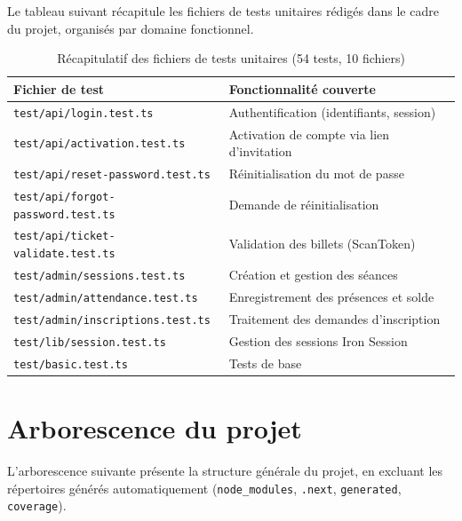 \documentclass{article}
\begin{document}
Le tableau suivant récapitule les fichiers de tests unitaires rédigés dans le cadre
du projet, organisés par domaine fonctionnel.

\begin{table}[H]
\centering
\renewcommand{\arraystretch}{1.4}
\begin{tabular}{p{8cm} p{6cm}}
\toprule
\textbf{Fichier de test} & \textbf{Fonctionnalité couverte} \\
\midrule
\texttt{test/api/login.test.ts}            & Authentification (identifiants, session) \\
\texttt{test/api/activation.test.ts}       & Activation de compte via lien d'invitation \\
\texttt{test/api/reset-password.test.ts}   & Réinitialisation du mot de passe \\
\texttt{test/api/forgot-password.test.ts}  & Demande de réinitialisation \\
\texttt{test/api/ticket-validate.test.ts}  & Validation des billets (ScanToken) \\
\texttt{test/admin/sessions.test.ts}       & Création et gestion des séances \\
\texttt{test/admin/attendance.test.ts}     & Enregistrement des présences et solde \\
\texttt{test/admin/inscriptions.test.ts}   & Traitement des demandes d'inscription \\
\texttt{test/lib/session.test.ts}          & Gestion des sessions Iron Session \\
\texttt{test/basic.test.ts}               & Tests de base \\
\bottomrule
\end{tabular}
\caption{Récapitulatif des fichiers de tests unitaires (54 tests, 10 fichiers)}
\end{table}

\newpage

\section{Arborescence du projet}

L'arborescence suivante présente la structure générale du projet,
en excluant les répertoires générés automatiquement
(\texttt{node\_modules}, \texttt{.next}, \texttt{generated}, \texttt{coverage}).
\end{document}
